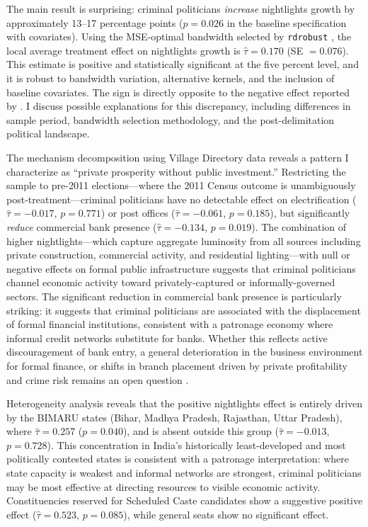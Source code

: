 \documentclass[12pt]{article}
\begin{document}
The main result is surprising: criminal politicians \textit{increase} nightlights growth by approximately 13--17 percentage points ($p=0.026$ in the baseline specification with covariates). Using the MSE-optimal bandwidth selected by \texttt{rdrobust} \citep{calonico2014,calonico2020}, the local average treatment effect on nightlights growth is $\hat{\tau} = 0.170$ (SE $= 0.076$). This estimate is positive and statistically significant at the five percent level, and it is robust to bandwidth variation, alternative kernels, and the inclusion of baseline covariates. The sign is directly opposite to the negative effect reported by \citet{prakash2019}. I discuss possible explanations for this discrepancy, including differences in sample period, bandwidth selection methodology, and the post-delimitation political landscape.

The mechanism decomposition using Village Directory data reveals a pattern I characterize as ``private prosperity without public investment.'' Restricting the sample to pre-2011 elections---where the 2011 Census outcome is unambiguously post-treatment---criminal politicians have no detectable effect on electrification ($\hat{\tau} = -0.017$, $p=0.771$) or post offices ($\hat{\tau} = -0.061$, $p=0.185$), but significantly \textit{reduce} commercial bank presence ($\hat{\tau} = -0.134$, $p=0.019$). The combination of higher nightlights---which capture aggregate luminosity from all sources including private construction, commercial activity, and residential lighting---with null or negative effects on formal public infrastructure suggests that criminal politicians channel economic activity toward privately-captured or informally-governed sectors. The significant reduction in commercial bank presence is particularly striking: it suggests that criminal politicians are associated with the displacement of formal financial institutions, consistent with a patronage economy where informal credit networks substitute for banks. Whether this reflects active discouragement of bank entry, a general deterioration in the business environment for formal finance, or shifts in branch placement driven by private profitability and crime risk remains an open question \citep[see][for evidence on the political economy of bank branch placement in India]{Cole2009}.

Heterogeneity analysis reveals that the positive nightlights effect is entirely driven by the BIMARU states (Bihar, Madhya Pradesh, Rajasthan, Uttar Pradesh), where $\hat{\tau} = 0.257$ ($p=0.040$), and is absent outside this group ($\hat{\tau} = -0.013$, $p=0.728$). This concentration in India's historically least-developed and most politically contested states is consistent with a patronage interpretation: where state capacity is weakest and informal networks are strongest, criminal politicians may be most effective at directing resources to visible economic activity. Constituencies reserved for Scheduled Caste candidates show a suggestive positive effect ($\hat{\tau} = 0.523$, $p=0.085$), while general seats show no significant effect.
\end{document}
